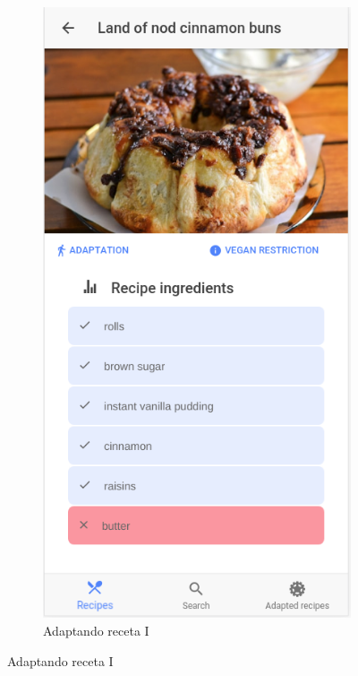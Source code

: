 \begin{figure}[H]
\begin{subfigure}[b]{0.30\linewidth}
        \label{fig:ejemplo1}
    \end{subfigure}
    \begin{subfigure}[b]{0.303\linewidth}
        \includegraphics[width=\linewidth]{imagenes/app/pantallas/ejemplo2.png}
        \caption{Adaptando receta I}

\end{subfigure}
\end{figure}
